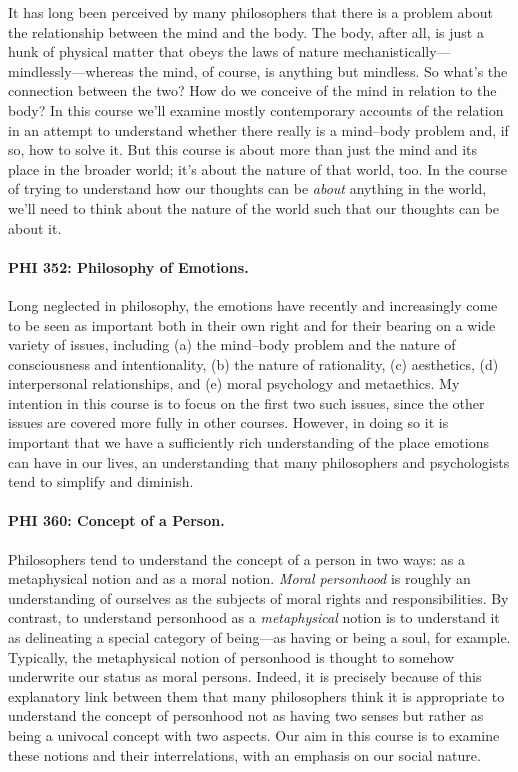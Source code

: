 \documentclass[11pt]{article}
\begin{document}
It has long been perceived by many philosophers that there is a problem about the relationship between the mind and the body. The body, after all, is just a hunk of physical matter that obeys the laws of nature mechanistically---mindlessly---whereas the mind, of course, is anything but mindless. So what's the connection between the two? How do we conceive of the mind in relation to the body? In this course we'll examine mostly contemporary accounts of the relation in an attempt to understand whether there really is a mind--body problem and, if so, how to solve it. But this course is about more than just the mind and its place in the broader world; it's about the nature of that world, too. In the course of trying to understand how our thoughts can be \emph{about} anything in the world, we'll need to think about the nature of the world such that our thoughts can be about it.

\paragraph{PHI 352: Philosophy of Emotions.}

Long neglected in philosophy, the emotions have recently and increasingly come to be seen as important both in their own right and for their bearing on a wide variety of issues, including (a) the mind--body problem and the nature of consciousness and intentionality, (b) the nature of rationality, (c) aesthetics, (d) interpersonal relationships, and (e) moral psychology and metaethics. My intention in this course is to focus on the first two such issues, since the other issues are covered more fully in other courses. However, in doing so it is important that we have a sufficiently rich understanding of the place emotions can have in our lives, an understanding that many philosophers and psychologists tend to simplify and diminish.

\paragraph{PHI 360: Concept of a Person.}

Philosophers tend to understand the concept of a person in two ways: as a metaphysical notion and as a moral notion. \emph{Moral personhood} is roughly an understanding of ourselves as the subjects of moral rights and responsibilities. By contrast, to understand personhood as a \emph{metaphysical} notion is to understand it as delineating a special category of being---as having or being a soul, for example. Typically, the metaphysical notion of personhood is thought to somehow underwrite our status as moral persons. Indeed, it is precisely because of this explanatory link between them that many philosophers think it is appropriate to understand the concept of personhood not as having two senses but rather as being a univocal concept with two aspects. Our aim in this course is to examine these notions and their interrelations, with an emphasis on our social nature.
\end{document}
